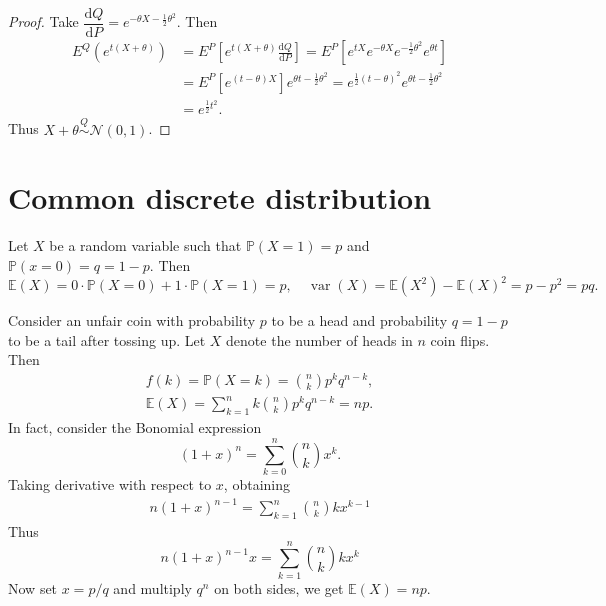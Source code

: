 \documentclass[11pt,singlecolumn, openany, citestyle=authoryear]{elegantbook}
\begin{document}
\begin{CJK}{UTF8}{gbsn}
\begin{example}
\end{example}
\begin{proof}
    Take $\dfrac{\mathrm{d}Q}{\mathrm{d}P}=e^{-\theta X - \frac{1}{2}\theta^2}$. Then 
    \begin{align*}
    E^Q(e^{t(X+\theta)})&=E^P \left[
        e^{t(X+\theta)}\frac{\mathrm{d}Q}{\mathrm{d}P}
    \right]=E^P [e^{tX}e^{-\theta X}e^{-\frac{1}{2}\theta^2}e^{\theta t}]\\
    &=E^P[e^{(t-\theta)X}]e^{\theta t-\frac{1}{2}\theta^2}
    =e^{\frac{1}{2}(t-\theta)^2}e^{\theta t-\frac{1}{2}\theta^2}\\
    &=e^{\frac{1}{2}t^2}.
    \end{align*}
    Thus $X+\theta \overset{Q}{\sim} \mathcal{N}(0,1)$.
\end{proof}

\section{Common discrete distribution}
\begin{example}[(Bernoulli)]
    Let $X$ be a random variable such that $\mathbb{P}(X=1)=p$ and $\mathbb{P}(x=0)=q=1-p$.
    Then 
    $$
    \mathbb{E}(X)=0\cdot \mathbb{P}(X=0)+ 1\cdot \mathbb{P}(X=1)=p,\quad 
    \operatorname{var}(X)=\mathbb{E}(X^2)-\mathbb{E}(X)^2 = p-p^2 = pq.
    $$
\end{example}
\begin{example}[(Binomial($n,p$))]
    Consider an unfair coin with probability $p$ to be a head and probability $q=1-p$
    to be a tail after tossing up.
    Let $X$ denote the number of heads in $n$ coin flips.
    Then 
    \begin{gather*}
    f(k)=\mathbb{P}(X=k)=\binom{n}{k}p^kq^{n-k},\\  
    \mathbb{E}(X) = \sum_{k=1}^{n}k\binom{n}{k}p^kq^{n-k}=np.
    \end{gather*}
    In fact, consider the Bonomial expression 
    $$
    (1+x)^n=\sum_{k=0}^n \binom{n}{k} x^k.
    $$
    Taking derivative with respect to $x$, obtaining
    \begin{align*}
        n(1+x)^{n-1} = \sum_{k=1}^n \binom{n}{k} kx^{k-1}
    \end{align*}
    Thus 
    $$
    n(1+x)^{n-1}x =\sum_{k=1}^{n} \binom{n}{k} kx^{k}
    $$
    Now set $x=p/q$ and multiply $q^n$ on both sides, we get $\mathbb{E}(X)=np$.


\end{example}
\end{CJK}
\end{document}

